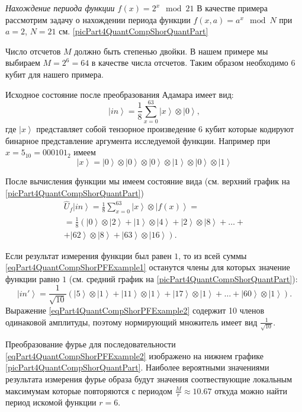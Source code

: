 \begin{example}
\emph{Нахождение периода функции $f\left(x\right) = 2^x \mod 21$}
\label{exPart4QuantCompShorQuantPeriodFinding}
В качестве примера рассмотрим задачу о нахождении периода функции 
$f\left(x, a\right) = a^x \mod{N}$ при $a=2$, $N = 21$ см. 
\autoref{picPart4QuantCompShorQuantPart}

Число отсчетов  $M$ должно быть степенью двойки. В нашем примере мы
выбираем $M = 2^6 = 64$ в качестве числа отсчетов. Таким образом
необходимо 6 кубит для нашего примера.

Исходное состояние после  преобразования Адамара имеет вид:
\begin{equation}
\left|in\right> = \frac{1}{8}\sum_{x = 0}^{63}\left|x\right> \otimes \left|0\right>,
\nonumber
\end{equation}
где $\left|x\right>$ представляет собой тензорное произведение 
6 кубит
которые кодируют бинарное представление аргумента исследуемой
функции. Например при $x=5_{10}=000101_2$ имеем
\[
\left|x\right> = \left|0\right>\otimes \left|0\right>\otimes
\left|0\right>\otimes 
\left|1\right>\otimes \left|0\right>\otimes \left|1\right>
\]

После вычисления функции мы имеем состояние вида (см. верхний график
на \autoref{picPart4QuantCompShorQuantPart})
\begin{eqnarray}
\hat{U}_f\left|in\right> = \frac{1}{8}\sum_{x = 0}^{63}\left|x\right>
\otimes \left|f\left(x\right)\right> = 
\nonumber \\
=
\frac{1}{8}
\left(
\left|0\right>\otimes\left|2\right> + 
\left|1\right>\otimes\left|4\right> + 
\left|2\right>\otimes\left|8\right> + \dots +
\right.
\nonumber \\
\left.
+
\left|62\right>\otimes\left|8\right> +
\left|63\right>\otimes\left|16\right>
\right).
\label{eqPart4QuantCompShorPFExample1}
\end{eqnarray}

Если результат измерения функции был равен $1$, то из всей суммы
\eqref{eqPart4QuantCompShorPFExample1} останутся члены для которых
значение функции равно $1$ (см. средний график
на \autoref{picPart4QuantCompShorQuantPart}):
\begin{equation}
\left|in'\right> = \frac{1}{\sqrt{10}}\left( 
\left|5\right>\otimes\left|1\right> +
\left|11\right>\otimes\left|1\right> +
\left|17\right>\otimes\left|1\right> +
\dots +
\left|60\right>\otimes\left|1\right>
\right).
\label{eqPart4QuantCompShorPFExample2}
\end{equation} 
Выражение \eqref{eqPart4QuantCompShorPFExample2} содержит 10 членов
одинаковой амплитуды, поэтому нормирующий множитель имеет вид
$\frac{1}{\sqrt{10}}$.

Преобразование фурье для последовательности
\eqref{eqPart4QuantCompShorPFExample2} изображено на нижнем графике
\autoref{picPart4QuantCompShorQuantPart}. Наиболее вероятными
значениями результата измерения фурье образа будут значения
соотвествующие локальным максимумам которые повторяются с периодом 
$\frac{M}{r}\approx10.67$ откуда можно найти период искомой функции
$r=6$. 

\end{example}
